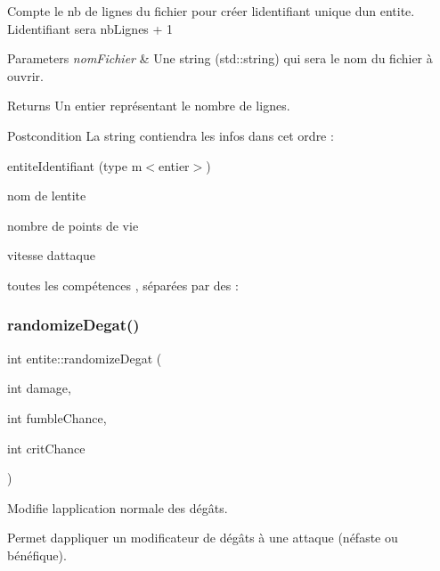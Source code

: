 Compte le nb de lignes du fichier pour créer l\textquotesingle{}identifiant unique d\textquotesingle{}un entite. L\textquotesingle{}identifiant sera {\ttfamily  nb\+Lignes + 1 } 
\begin{DoxyParams}{Parameters}
{\em nom\+Fichier} & Une string (std\+::string) qui sera le nom du fichier à ouvrir. \\
\hline
\end{DoxyParams}
\begin{DoxyReturn}{Returns}
Un entier représentant le nombre de lignes. 
\end{DoxyReturn}
\begin{DoxyPostcond}{Postcondition}
La string contiendra les infos dans cet ordre \+:
\begin{DoxyItemize}
\item entite\+Identifiant (type {\ttfamily m$<$entier$>$})
\item nom de l\textquotesingle{}entite
\item nombre de points de vie
\item vitesse d\textquotesingle{}attaque
\item toutes les compétences , séparées par des {\ttfamily \+:} 
\end{DoxyItemize}
\end{DoxyPostcond}
\mbox{\label{classentite_a8f147ff4822de170f46850e5869e0d7d}} 
\subsubsection{\texorpdfstring{randomize\+Degat()}{randomizeDegat()}}
{\footnotesize\ttfamily int entite\+::randomize\+Degat (\begin{DoxyParamCaption}\item[{int}]{damage,  }\item[{int}]{fumble\+Chance,  }\item[{int}]{crit\+Chance }\end{DoxyParamCaption})}



Modifie l\textquotesingle{}application normale des dégâts. 

Permet d\textquotesingle{}appliquer un modificateur de dégâts à une attaque (néfaste ou bénéfique).

